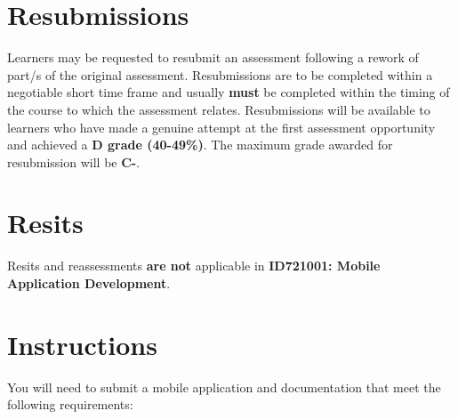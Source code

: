 \documentclass{article}
\begin{document}
\section*{Resubmissions}
Learners may be requested to resubmit an assessment following a rework of part/s of the original assessment. Resubmissions are to be completed within a negotiable short time frame and usually \textbf{must} be completed within the timing of the course to which the assessment relates. Resubmissions will be available to learners who have made a genuine attempt at the first assessment opportunity and achieved a \textbf{D grade (40-49\%)}. The maximum grade awarded for resubmission will be \textbf{C-}.

\section*{Resits}
Resits and reassessments \textbf{are not} applicable in \textbf{ID721001: Mobile Application Development}.

\section*{Instructions}
You will need to submit a mobile application and documentation that meet the following requirements:
\end{document}
